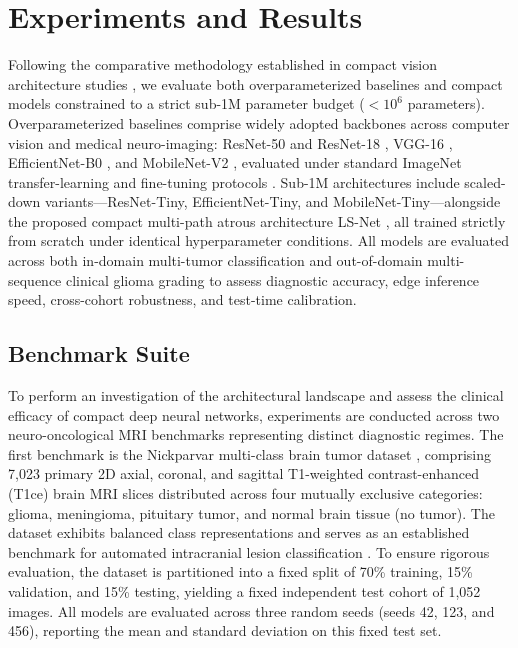 \section{Experiments and Results}
\label{sec:experiments}

Following the comparative methodology established in compact vision architecture studies \cite{16}, we evaluate both overparameterized baselines and compact models constrained to a strict sub-1M parameter budget ($<10^6$ parameters). Overparameterized baselines comprise widely adopted backbones across computer vision and medical neuro-imaging: ResNet-50 and ResNet-18 \cite{10}, VGG-16 \cite{29}, EfficientNet-B0 \cite{30}, and MobileNet-V2 \cite{27}, evaluated under standard ImageNet transfer-learning and fine-tuning protocols \cite{7, 38, 39}. Sub-1M architectures include scaled-down variants---ResNet-Tiny, EfficientNet-Tiny, and MobileNet-Tiny---alongside the proposed compact multi-path atrous architecture LS-Net \cite{16}, all trained strictly from scratch under identical hyperparameter conditions. All models are evaluated across both in-domain multi-tumor classification and out-of-domain multi-sequence clinical glioma grading to assess diagnostic accuracy, edge inference speed, cross-cohort robustness, and test-time calibration.

\subsection{Benchmark Suite}

To perform an investigation of the architectural landscape and assess the clinical efficacy of compact deep neural networks, experiments are conducted across two neuro-oncological MRI benchmarks representing distinct diagnostic regimes. The first benchmark is the Nickparvar multi-class brain tumor dataset \cite{26}, comprising 7,023 primary 2D axial, coronal, and sagittal T1-weighted contrast-enhanced (T1ce) brain MRI slices distributed across four mutually exclusive categories: glioma, meningioma, pituitary tumor, and normal brain tissue (no tumor). The dataset exhibits balanced class representations and serves as an established benchmark for automated intracranial lesion classification \cite{26}. To ensure rigorous evaluation, the dataset is partitioned into a fixed split of 70\% training, 15\% validation, and 15\% testing, yielding a fixed independent test cohort of 1,052 images. All models are evaluated across three random seeds (seeds 42, 123, and 456), reporting the mean and standard deviation on this fixed test set.

